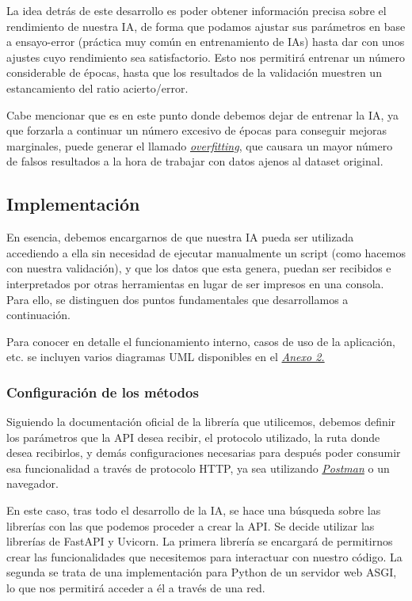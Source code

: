 \documentclass{article}
\begin{document}
La idea detrás de este desarrollo es poder obtener información precisa sobre el rendimiento de nuestra IA, de forma que podamos ajustar sus parámetros en base a ensayo-error (práctica muy común en entrenamiento de IAs) hasta dar con unos ajustes cuyo rendimiento sea satisfactorio. Esto nos permitirá entrenar un número considerable de épocas, hasta que los resultados de la validación muestren un estancamiento del ratio acierto/error.

Cabe mencionar que es en este punto donde debemos dejar de entrenar la IA, ya que forzarla a continuar un número excesivo de épocas para conseguir mejoras marginales, puede generar el llamado \hyperref[sec:terms]{\textit{overfitting}\tec}, que causara un mayor número de falsos resultados a la hora de trabajar con datos ajenos al dataset original.


\subsection{Implementación}

En esencia, debemos encargarnos de que nuestra IA pueda ser utilizada accediendo a ella sin necesidad de ejecutar manualmente un script (como hacemos con nuestra validación), y que los datos que esta genera, puedan ser recibidos e interpretados por otras herramientas en lugar de ser impresos en una consola. Para ello, se distinguen dos puntos fundamentales que desarrollamos a continuación.

Para conocer en detalle el funcionamiento interno, casos de uso de la aplicación, etc. se incluyen varios diagramas UML disponibles en el \hyperref[sec:uml]{\textit{Anexo 2.}}

\subsubsection{Configuración de los métodos}
Siguiendo la documentación oficial de la librería que utilicemos, debemos definir los parámetros que la API desea recibir, el protocolo utilizado, la ruta donde desea recibirlos, y demás configuraciones necesarias para después poder consumir esa funcionalidad a través de protocolo HTTP, ya sea utilizando \hyperref[sec:terms]{\textit{Postman}\tec} o un navegador.

En este caso, tras todo el desarrollo de la IA, se hace una búsqueda sobre las librerías con las que podemos proceder a crear la API. Se decide utilizar las librerías de FastAPI y Uvicorn. La primera librería se encargará de permitirnos crear las funcionalidades que necesitemos para interactuar con nuestro código. La segunda se trata de una implementación para Python de un servidor web ASGI, lo que nos permitirá acceder a él a través de una red.
\end{document}
